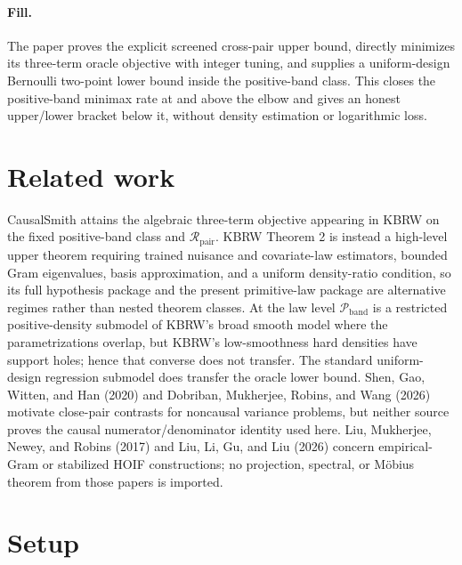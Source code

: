 \documentclass{article}
\begin{document}
\paragraph{Fill.} The paper proves the explicit screened cross-pair upper bound, directly minimizes its three-term oracle objective with integer tuning, and supplies a uniform-design Bernoulli two-point lower bound inside the positive-band class.  This closes the positive-band minimax rate at and above the elbow and gives an honest upper/lower bracket below it, without density estimation or logarithmic loss.

\section{Related work}

CausalSmith attains the algebraic three-term objective appearing in KBRW on the fixed positive-band class and \(\mathcal R_{\mathrm{pair}}\).  KBRW Theorem 2 is instead a high-level upper theorem requiring trained nuisance and covariate-law estimators, bounded Gram eigenvalues, basis approximation, and a uniform density-ratio condition, so its full hypothesis package and the present primitive-law package are alternative regimes rather than nested theorem classes.  At the law level \(\mathcal P_{\mathrm{band}}\) is a restricted positive-density submodel of KBRW's broad smooth model where the parametrizations overlap, but KBRW's low-smoothness hard densities have support holes; hence that converse does not transfer.  The standard uniform-design regression submodel does transfer the oracle lower bound.  Shen, Gao, Witten, and Han (2020) and Dobriban, Mukherjee, Robins, and Wang (2026) motivate close-pair contrasts for noncausal variance problems, but neither source proves the causal numerator/denominator identity used here.  Liu, Mukherjee, Newey, and Robins (2017) and Liu, Li, Gu, and Liu (2026) concern empirical-Gram or stabilized HOIF constructions; no projection, spectral, or M\"obius theorem from those papers is imported.

\section{Setup}
\end{document}
